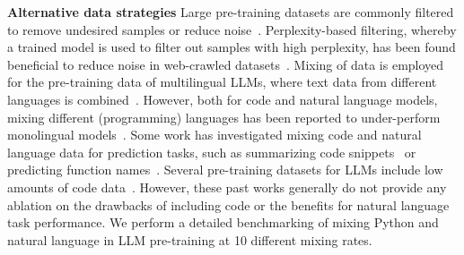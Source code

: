 \documentclass{article}
\begin{document}
\noindent
\textbf{Alternative data strategies} Large pre-training datasets are commonly filtered to remove undesired samples or reduce noise~\cite{sorscher2022beyond}. Perplexity-based filtering, whereby a trained model is used to filter out samples with high perplexity, has been found beneficial to reduce noise in web-crawled datasets~\cite{wenzek2019ccnet}. Mixing of data is employed for the pre-training data of multilingual LLMs, where text data from different languages is combined~\cite{conneau2019unsupervised,xue2020mt5,soltan2022alexatm,muennighoff2022crosslingual}. However, both for code and natural language models, mixing different (programming) languages has been reported to under-perform monolingual models~\cite{nijkamp2022codegen,virtanen2019multilingual}. Some work has investigated mixing code and natural language data for prediction tasks, such as summarizing code snippets~\cite{iyer2016summarizing} or predicting function names~\cite{allamanis2015suggesting}. Several pre-training datasets for LLMs include low amounts of code data~\cite{gao2020pile,rae2021scaling,scao2022bloom}. However, these past works generally do not provide any ablation on the drawbacks of including code or the benefits for natural language task performance. We perform a detailed benchmarking of mixing Python and natural language in LLM pre-training at 10 different mixing rates.


\end{document}
